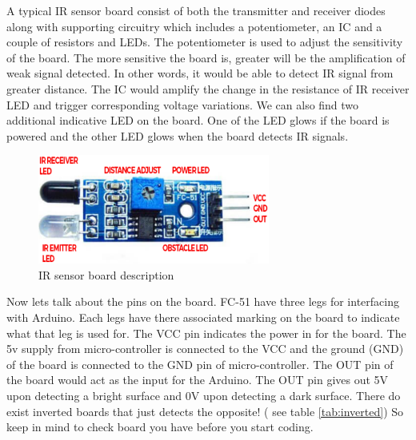 \par A typical \ac{IR} sensor board consist of both the transmitter and receiver diodes along with supporting circuitry which includes a potentiometer, an \ac{IC} and a couple of resistors and LEDs. The potentiometer is used to adjust the sensitivity of the board. The more sensitive the board is, greater will be the amplification of weak signal detected. In other words, it would be able to detect \ac{IR} signal from greater distance. The \ac{IC} would amplify the change in the resistance of \ac{IR} receiver LED and trigger corresponding voltage variations. We can also find two additional indicative LED on the board. One of the LED glows if the board is powered and the other LED glows when the board detects \ac{IR} signals.

\begin{figure}	
	\centering
	\includegraphics[width=3in]{Images/IR Sensor/IR_board_desp.png}
	\caption{\ac{IR} sensor board description}
\end{figure}

 Now lets talk about the pins on the board. FC-51 have three legs for interfacing with Arduino. Each legs have there associated marking on the board to indicate what that leg is used for. The VCC pin indicates the power in for the board. The 5v supply from micro-controller is connected to the VCC and the ground (GND) of the board is connected to the GND pin of micro-controller. The OUT pin of the board would act as the input for the Arduino. The OUT pin gives out 5V upon detecting a bright surface and 0V upon detecting a dark surface. There do exist inverted boards that just detects the opposite! ( see table \ref{tab:inverted}) So keep in mind to check board you have before you start coding. 


